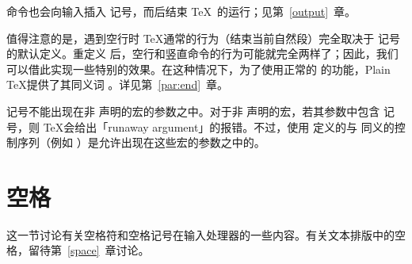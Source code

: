 \documentclass{book}
\begin{document}
 命令也会向输入插入  记号，而后结束 \TeX\ 的运行；见第~\ref{output}~章。

值得注意的是，遇到空行时 \TeX 通常的行为（结束当前自然段）完全取决于  记号的默认定义。重定义  后，空行和竖直命令的行为可能就完全两样了；因此，我们可以借此实现一些特别的效果。在这种情况下，为了使用正常的  的功能，Plain \TeX 提供了其同义词 。详见第~\ref{par:end}~章。

 记号不能出现在非  声明的宏的参数之中。对于非  声明的宏，若其参数中包含  记号，则 \TeX 会给出「runaway argument」的报错。不过，使用  定义的与  同义的控制序列（例如 ）是允许出现在这些宏的参数之中的。

\section{空格}

这一节讨论有关空格符和空格记号在输入处理器的一些内容。有关文本排版中的空格，留待第~\ref{space}~章讨论。
\end{document}
